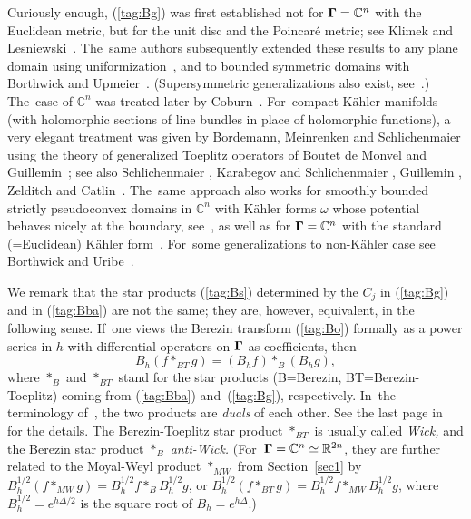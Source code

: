 \documentclass[11pt]{amsart}
\numberwithin{equation}{section}
\theoremstyle{remark}
\newcommand\Omg{{\bigam}}   %
\newcommand\RR{\mathbb R}
\newcommand{\CC}{\C}
\newcommand{\bigam}{\mbox{\boldmath $\Gamma$}}
\newcommand{\C}{\mathbb C}
\begin{document}
Curiously enough, (\ref{tag:Bg}) was first established not for $\Omg=\CC^n$
with the Euclidean metric, but for the unit disc and the Poincar\'e metric; see
Klimek and Lesniewski~\cite{bib:KLa}. The~same authors subsequently extended
these results to any plane domain using uniformization~\cite{bib:KLb}, and to
bounded symmetric domains with Borthwick and Upmeier~\cite{bib:BLU}.
(Supersymmetric generalizations also exist, see~\cite{bib:BLUR}.) The~case of
$\CC^n$ was treated later by Coburn~\cite{bib:Cob}. For~compact K\"ahler
manifolds (with holomorphic sections of line bundles in place of holomorphic
functions), a very elegant treatment was given by Bordemann, Meinrenken and
Schlichenmaier \cite{bib:BMS} using the theory of generalized Toeplitz
operators of Boutet de Monvel and Guillemin~\cite{bib:BdMG}; see also
Schlichenmaier \cite{bib:Schli} \cite{bib:SchliM}, Karabegov and Schlichenmaier
\cite{bib:KaSchli}, Guillemin \cite{bib:Guill}, Zelditch \cite{bib:Zeld} and
Catlin~\cite{bib:Tian}. The~same approach also works for smoothly bounded
strictly pseudoconvex domains in $\CC^n$ with K\"ahler forms $\omega$ whose
potential behaves nicely at the boundary, see~\cite{bib:ESI}, as well as for
$\Omg=\CC^n$ with the standard (=Euclidean) K\"ahler form~\cite{bib:Borthw}.
For~some generalizations to non-K\"ahler case see Borthwick and
Uribe~\cite{bib:BU}.

We remark that the star products (\ref{tag:Bs}) determined by the $C_j$ in
(\ref{tag:Bg}) and in (\ref{tag:Bba}) are not the same; they are, however,
equivalent, in the following sense. If~one views the Berezin transform
(\ref{tag:Bo}) formally as a power series in $h$ with differential operators on
$\Omg$ as coefficients, then
$$ B_h( f*_{BT} g) = (B_h f) *_B (B_h g) , $$
where $*_B$ and $*_{BT}$ stand for the star products (B=Berezin,
BT=Berezin-Toeplitz) coming from (\ref{tag:Bba}) and~(\ref{tag:Bg}),
respectively. In~the terminology of~\cite{bib:KarA}, the two products are
{\sl duals\/} of each other. See the last page in~\cite{bib:ESI} for the
details. The Berezin-Toeplitz star product $*_{BT}$ is usually called
{\sl Wick,\/} and the Berezin star product $*_B$ {\sl anti-Wick.\/}
(For~$\Omg=\CC^n\simeq\RR^{2n}$, they are further related to the Moyal-Weyl
product $*_{MW}$ from Section~\ref{sec1} by $B_h^{1/2}(f*_{MW}g)=B_h^{1/2}f
*_B B_h^{1/2}g$, or $B_h^{1/2}(f*_{BT}g)=B_h^{1/2}f*_{MW} B_h^{1/2}g$, where
$B_h^{1/2}=e^{h\Delta/2}$ is the square root of $B_h=e^{h\Delta}$.)
\end{document}
